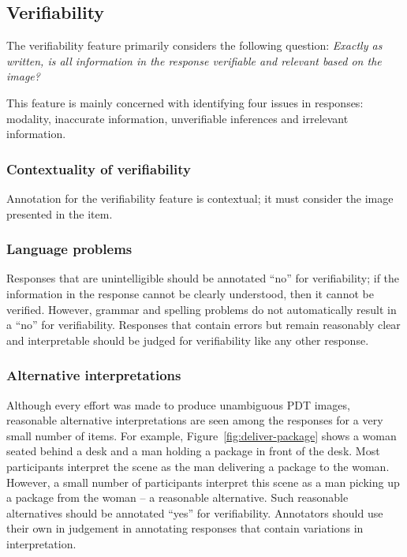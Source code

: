 \documentclass[12pt,notitlepage]{article}
\begin{document}
\subsection{Verifiability} \label{subsec:verifiability}

The verifiability feature primarily considers the following question: \textit{Exactly as written, is all information in the response verifiable and relevant based on the image?}

This feature is mainly concerned with identifying four issues in responses: modality, inaccurate information, unverifiable inferences and irrelevant information. 

\subsubsection{Contextuality of verifiability} Annotation for the verifiability feature is contextual; it must consider the image presented in the item. 

\subsubsection{Language problems} Responses that are unintelligible should be annotated ``no'' for verifiability; if the information in the response cannot be clearly understood, then it cannot be verified. However, grammar and spelling problems do not automatically result in a ``no'' for verifiability. Responses that contain errors but remain reasonably clear and interpretable should be judged for verifiability like any other response.

\subsubsection{Alternative interpretations} Although every effort was made to produce unambiguous PDT images, reasonable alternative interpretations are seen among the responses for a very small number of items. For example, Figure~\ref{fig:deliver-package} shows a woman seated behind a desk and a man holding a package in front of the desk. Most participants interpret the scene as the man delivering a package to the woman. However, a small number of participants interpret this scene as a man picking up a package from the woman -- a reasonable alternative. Such reasonable alternatives should be annotated ``yes'' for verifiability. Annotators should use their own in judgement in annotating responses that contain variations in interpretation.
\end{document}
